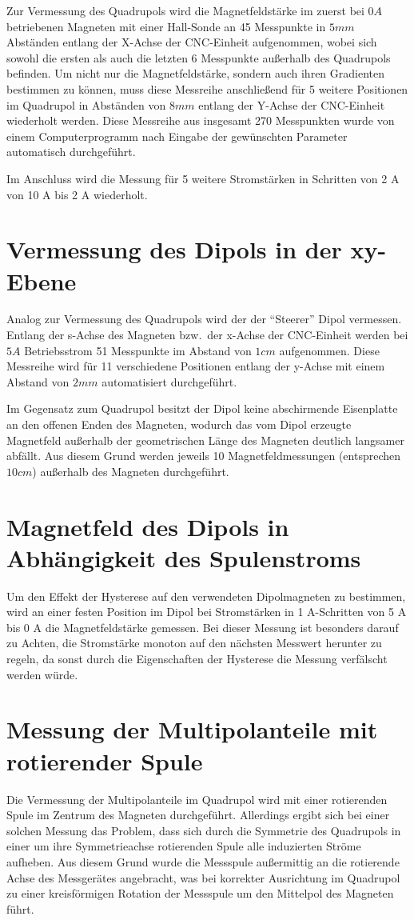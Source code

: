\documentclass[bigchapter,colorback,accentcolor=tud4b,linedtoc,11pt]{tudreport}
\begin{document}
Zur Vermessung des Quadrupols wird die Magnetfeldstärke im zuerst bei $0 A$ betriebenen Magneten mit einer Hall-Sonde an 45 Messpunkte in $5 mm$ Abständen entlang der X-Achse der CNC-Einheit aufgenommen, wobei sich sowohl die ersten als auch die letzten 6 Messpunkte außerhalb des Quadrupols befinden. Um nicht nur die Magnetfeldstärke, sondern auch ihren Gradienten bestimmen zu können, muss diese Messreihe anschließend für 5 weitere Positionen im Quadrupol in Abständen von $8mm$ entlang der Y-Achse der CNC-Einheit wiederholt werden. Diese Messreihe aus insgesamt 270 Messpunkten wurde von einem Computerprogramm nach Eingabe der gewünschten Parameter automatisch durchgeführt.

Im Anschluss wird die Messung für 5 weitere Stromstärken in Schritten von 2 A von 10 A bis 2 A wiederholt.

\section{Vermessung des Dipols in der xy-Ebene}
Analog zur Vermessung des Quadrupols wird der der "`Steerer"' Dipol vermessen. Entlang der s-Achse des Magneten bzw.\ der x-Achse der CNC-Einheit werden bei $5 A$ Betriebsstrom 51 Messpunkte im Abstand von $1 cm$ aufgenommen. Diese Messreihe wird für 11 verschiedene Positionen entlang der y-Achse mit einem Abstand von $2 mm$ automatisiert durchgeführt.

Im Gegensatz zum Quadrupol besitzt der Dipol keine abschirmende Eisenplatte an den offenen Enden des Magneten, wodurch das vom Dipol erzeugte Magnetfeld außerhalb der geometrischen Länge des Magneten deutlich langsamer abfällt. Aus diesem Grund werden jeweils 10 Magnetfeldmessungen (entsprechen $10 cm$) außerhalb des Magneten durchgeführt.

\section{Magnetfeld des Dipols in Abhängigkeit des Spulenstroms}

Um den Effekt der Hysterese auf den verwendeten Dipolmagneten zu bestimmen, wird an einer festen Position im Dipol bei Stromstärken in 1 A-Schritten von 5 A bis 0 A die Magnetfeldstärke gemessen. Bei dieser Messung ist besonders darauf zu Achten, die Stromstärke monoton auf den nächsten Messwert herunter zu regeln, da sonst durch die Eigenschaften der Hysterese die Messung verfälscht werden würde.

\section{Messung der Multipolanteile mit rotierender Spule}
Die Vermessung der Multipolanteile im Quadrupol wird mit einer rotierenden Spule im Zentrum des Magneten durchgeführt. Allerdings ergibt sich bei einer solchen Messung das Problem, dass sich durch die Symmetrie des Quadrupols in einer um ihre Symmetrieachse rotierenden Spule alle induzierten Ströme aufheben. Aus diesem Grund wurde die Messspule außermittig an die rotierende Achse des Messgerätes angebracht, was bei korrekter Ausrichtung im Quadrupol zu einer kreisförmigen Rotation der Messspule um den Mittelpol des Magneten führt.
\end{document}
